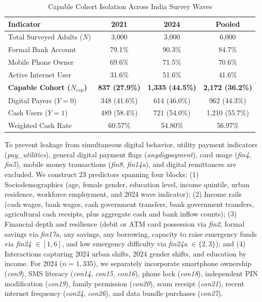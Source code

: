 \documentclass[conference]{IEEEtran}
\begin{document}
\begin{table}[t]
\caption{Capable Cohort Isolation Across India Survey Waves}
\centering
\footnotesize
\setlength{\tabcolsep}{4pt}
\begin{tabularx}{\columnwidth}{@{} >{\raggedright\arraybackslash}X c c c @{}}
\toprule
\textbf{Indicator} & \textbf{2021} & \textbf{2024} & \textbf{Pooled} \\
\midrule
Total Surveyed Adults ($N$) & 3,000 & 3,000 & 6,000 \\
Formal Bank Account & 79.1\% & 90.3\% & 84.7\% \\
Mobile Phone Owner & 69.6\% & 71.5\% & 70.6\% \\
Active Internet User & 31.6\% & 51.6\% & 41.6\% \\
\textbf{Capable Cohort ($N_{\text{cap}}$)} & \textbf{837 (27.9\%)} & \textbf{1,335 (44.5\%)} & \textbf{2,172 (36.2\%)} \\
\quad Digital Payers ($Y=0$) & 348 (41.6\%) & 614 (46.0\%) & 962 (44.3\%) \\
\quad Cash Users ($Y=1$) & 489 (58.4\%) & 721 (54.0\%) & 1,210 (55.7\%) \\
Weighted Cash Rate & 60.57\% & 54.80\% & 56.97\% \\
\bottomrule
\end{tabularx}
\label{tab:cohort}
\end{table}

To prevent leakage from simultaneous digital behavior, utility payment indicators (\textit{pay\_utilities}), general digital payment flags (\textit{anydigpayment}), card usage (\textit{fin4}, \textit{fin5}), mobile money transactions (\textit{fin8}, \textit{fin14a}), and digital remittances are excluded. We construct 23 predictors spanning four blocks: (1) Sociodemographics (age, female gender, education level, income quintile, urban residence, workforce employment, and 2024 wave indicator); (2) Income rails (cash wages, bank wages, cash government transfers, bank government transfers, agricultural cash receipts, plus aggregate cash and bank inflow counts); (3) Financial depth and resilience (debit or ATM card possession via \textit{fin2}, formal savings via \textit{fin17a}, any savings, any borrowing, capacity to raise emergency funds via \textit{fin24} $\in [1,6]$, and low emergency difficulty via \textit{fin24a} $\in \{2,3\}$); and (4) Interactions capturing 2024 urban shifts, 2024 gender shifts, and education by income. For 2024 ($n = 1,335$), we separately incorporate smartphone ownership (\textit{con9}), SMS literacy (\textit{con14}, \textit{con15}, \textit{con16}), phone lock (\textit{con18}), independent PIN modification (\textit{con19}), family permission (\textit{con20}), scam receipt (\textit{con21}), recent internet frequency (\textit{con24}, \textit{con26}), and data bundle purchases (\textit{con27}).
\end{document}
